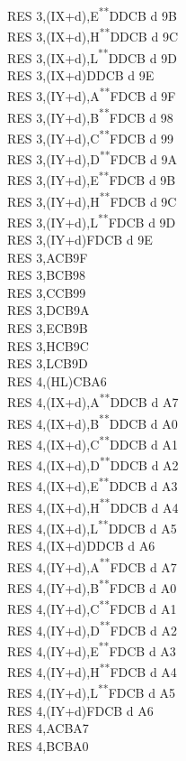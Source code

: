 \documentclass[twoside,openright,a4paper]{book}
\newcommand{\UNDOC}{\textnormal{\textsuperscript{**}}}
\begin{document}
\begin{multicols}{3}
{\begin{tabbing}
	RES 3,(IX+d),E\UNDOC\>DDCB d 9B\\
	RES 3,(IX+d),H\UNDOC\>DDCB d 9C\\
	RES 3,(IX+d),L\UNDOC\>DDCB d 9D\\
	RES 3,(IX+d)\>DDCB d 9E\\
	RES 3,(IY+d),A\UNDOC\>FDCB d 9F\\
	RES 3,(IY+d),B\UNDOC\>FDCB d 98\\
	RES 3,(IY+d),C\UNDOC\>FDCB d 99\\
	RES 3,(IY+d),D\UNDOC\>FDCB d 9A\\
	RES 3,(IY+d),E\UNDOC\>FDCB d 9B\\
	RES 3,(IY+d),H\UNDOC\>FDCB d 9C\\
	RES 3,(IY+d),L\UNDOC\>FDCB d 9D\\
	RES 3,(IY+d)\>FDCB d 9E\\
	RES 3,A\>CB9F\\
	RES 3,B\>CB98\\
	RES 3,C\>CB99\\
	RES 3,D\>CB9A\\
	RES 3,E\>CB9B\\
	RES 3,H\>CB9C\\
	RES 3,L\>CB9D\\
	RES 4,(HL)\>CBA6\\
	RES 4,(IX+d),A\UNDOC\>DDCB d A7\\
	RES 4,(IX+d),B\UNDOC\>DDCB d A0\\
	RES 4,(IX+d),C\UNDOC\>DDCB d A1\\
	RES 4,(IX+d),D\UNDOC\>DDCB d A2\\
	RES 4,(IX+d),E\UNDOC\>DDCB d A3\\
	RES 4,(IX+d),H\UNDOC\>DDCB d A4\\
	RES 4,(IX+d),L\UNDOC\>DDCB d A5\\
	RES 4,(IX+d)\>DDCB d A6\\
	RES 4,(IY+d),A\UNDOC\>FDCB d A7\\
	RES 4,(IY+d),B\UNDOC\>FDCB d A0\\
	RES 4,(IY+d),C\UNDOC\>FDCB d A1\\
	RES 4,(IY+d),D\UNDOC\>FDCB d A2\\
	RES 4,(IY+d),E\UNDOC\>FDCB d A3\\
	RES 4,(IY+d),H\UNDOC\>FDCB d A4\\
	RES 4,(IY+d),L\UNDOC\>FDCB d A5\\
	RES 4,(IY+d)\>FDCB d A6\\
	RES 4,A\>CBA7\\
	RES 4,B\>CBA0\\

\end{tabbing}}
\end{multicols}
\end{document}
